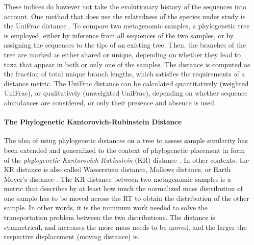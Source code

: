 These indices do however not take the evolutionary history of the sequences into account.
One method that does use the relatedness of the species under study is the UniFrac distance \cite{Lozupone2005,Lozupone2007a}.
To compare two metagenomic samples, a phylogenetic tree is employed,
either by inference from all sequences of the two samples,
or by assigning the sequences to the tips of an existing tree.
Then, the branches of the tree are marked as either shared or unique,
depending on whether they lead to taxa that appear in both or only one of the samples.
The distance is computed as the fraction of total unique branch lengths,
which satisfies the requirements of a distance metric.
The UniFrac distance can be calculated quantitatively (weighted UniFrac), or qualitatively (unweighted UniFrac),
depending on whether sequence abundances are considered, or only their presence and absence is used.

\paragraph{The Phylogenetic Kantorovich-Rubinstein Distance}
\label{ch:Foundations:sec:PhylogeneticPlacement:sub:Distances:par:KR}

The idea of using phylogenetic distances on a tree to assess sample similarity
has been extended and generalized to the context of phylogenetic placement
in form of the \emph{phylogenetic Kantorovich-Rubinstein} (KR) distance \cite{Matsen2011a,Evans2012}.
In other contexts, the KR distance is also called Wasserstein distance, Mallows distance, or Earth Mover's distance
\cite{Mallows1972,Rachev1985,Levina2001,Villani2008}.
The KR distance between two metagenomic samples is a metric that describes
by at least how much the normalized mass distribution of one sample has to be moved across the \ac{RT}
to obtain the distribution of the other sample.
In other words, it is the minimum work needed to solve the transportation problem between the two distributions.
The distance is symmetrical, and increases the more mass needs to be moved,
and the larger the respective displacement (moving distance) is.

